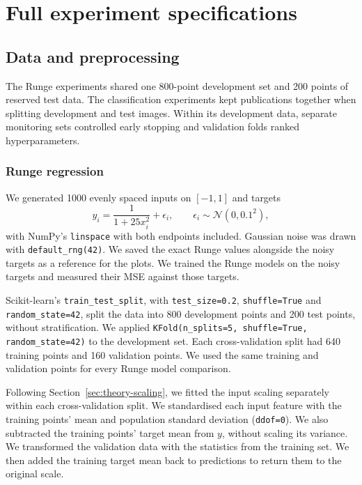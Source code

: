 \section{Full experiment specifications}
\label{app:experiment-settings}
\subsection{Data and preprocessing}
The Runge experiments shared one
800-point development set and 200 points of reserved test data.
The classification experiments kept publications together when splitting development
and test images. Within its development data, separate monitoring sets
controlled early stopping and validation folds ranked hyperparameters.

\subsubsection{Runge regression}
We generated 1000 evenly spaced inputs on $[-1,1]$ and targets
\[
y_i=\frac{1}{1+25x_i^2}+\epsilon_i,
\qquad \epsilon_i\sim\mathcal N(0,0.1^2),
\]
with NumPy's \nolinkurl{linspace} with both endpoints included. Gaussian
noise was drawn with \nolinkurl{default_rng(42)}. We saved the exact Runge
values alongside the noisy targets as a reference for the plots.
We trained the Runge models on the noisy targets and measured their
MSE against those targets.

Scikit-learn's \nolinkurl{train_test_split}, with
\nolinkurl{test_size=0.2}, \nolinkurl{shuffle=True} and
\nolinkurl{random_state=42}, split the data into 800 development points
and 200 test points, without stratification. We applied
\nolinkurl{KFold(n_splits=5, shuffle=True, random_state=42)} to the
development set. Each cross-validation split had 640 training points and 160 validation
points.
We used the same training and validation points for every Runge model
comparison.

Following Section~\ref{sec:theory-scaling}, we fitted the input scaling
separately within each cross-validation split. We standardised each input
feature with the training points' mean and population standard deviation (\nolinkurl{ddof=0}). We also
subtracted the training points' target mean from $y$, without scaling its
variance. We transformed the validation data with the statistics from the training set. We then added the training target mean back to predictions to return
them to the original scale.

